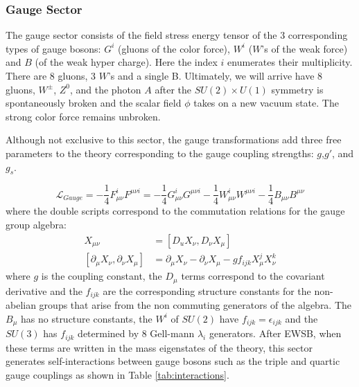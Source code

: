 \subsubsection{Gauge Sector}

The gauge sector consists of the field stress energy tensor of the 3 corresponding types of gauge bosons:
 $G^i$ (gluons of the color force), $W^i$ ($W$'s of the weak force) and $B$ (of the weak hyper charge). Here the index $i$ enumerates their multiplicity. There are 8 gluons, 3 $W$'s and a single B. Ultimately, we will arrive have 8 gluons, $W^{\pm}$, $Z^0$, and the photon $A$ after the $SU(2)\times U(1)$ symmetry is spontaneously broken 
and the scalar field $\phi$ takes on a new vacuum state. The strong color force remains unbroken. 

Although not exclusive to this sector, the gauge transformations add three free parameters to the theory corresponding to the gauge
coupling strengths: $g$,$g'$, and $g_s$. 

\begin{equation}
\mathcal{L}_{Gauge} = - \frac{1}{4} F_{\mu\nu}^{i} F^{\mu\nu i} =  - \frac{1}{4} G_{\mu\nu}^{i} G^{\mu\nu i} - \frac{1}{4} W^{i}_{\mu\nu} W^{\mu\nu i} - \frac{1}{4} B_{\mu\nu}B^{\mu\nu} 
\end{equation}
where the double scripts correspond to the commutation relations for the gauge group algebra:
\begin{align*}
X_{\mu\nu}   &= [D_u X_\nu, D_\nu X_\mu] \\
[\partial_\mu X_\nu, \partial_\nu X_\mu ] &= \partial_\mu X_\nu - \partial_\nu X_\mu - g f_{ijk} X_\mu^j X_\nu^k
\end{align*}
where $g$ is the coupling constant, the $D_\mu$ terms correspond to the covariant derivative and the $f_{ijk}$ are the corresponding structure constants for the non-abelian groups that arise from the non commuting generators of the algebra. The $B_\mu$ has no structure constants, the $W^i$ of $SU(2)$ have $f_{ijk}=\epsilon_{ijk}$ and the $SU(3)$ has $f_{ijk}$ determined by 8 Gell-mann $\lambda_i$ generators.
After EWSB, when these terms are written in  the mass eigenstates of the theory, this sector generates self-interactions 
between  gauge bosons such as the triple and quartic gauge couplings as shown in Table \ref{tab:interactions}. 


